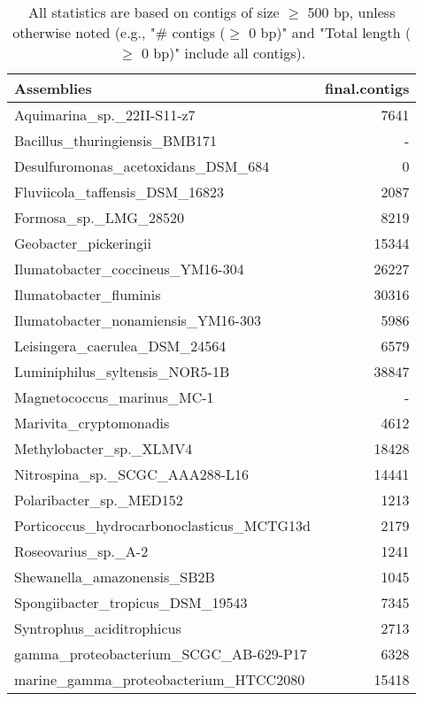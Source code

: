 \documentclass[12pt,a4paper]{article}
\begin{document}
\begin{table}[ht]
\begin{center}
\caption{All statistics are based on contigs of size $\geq$ 500 bp, unless otherwise noted (e.g., "\# contigs ($\geq$ 0 bp)" and "Total length ($\geq$ 0 bp)" include all contigs).}
\begin{tabular}{|l*{1}{|r}|}
\hline
Assemblies & final.contigs \\ \hline
Aquimarina\_sp.\_22II-S11-z7 & 7641 \\ \hline
Bacillus\_thuringiensis\_BMB171 & - \\ \hline
Desulfuromonas\_acetoxidans\_DSM\_684 & 0 \\ \hline
Fluviicola\_taffensis\_DSM\_16823 & 2087 \\ \hline
Formosa\_sp.\_LMG\_28520 & 8219 \\ \hline
Geobacter\_pickeringii & 15344 \\ \hline
Ilumatobacter\_coccineus\_YM16-304 & 26227 \\ \hline
Ilumatobacter\_fluminis & 30316 \\ \hline
Ilumatobacter\_nonamiensis\_YM16-303 & 5986 \\ \hline
Leisingera\_caerulea\_DSM\_24564 & 6579 \\ \hline
Luminiphilus\_syltensis\_NOR5-1B & 38847 \\ \hline
Magnetococcus\_marinus\_MC-1 & - \\ \hline
Marivita\_cryptomonadis & 4612 \\ \hline
Methylobacter\_sp.\_XLMV4 & 18428 \\ \hline
Nitrospina\_sp.\_SCGC\_AAA288-L16 & 14441 \\ \hline
Polaribacter\_sp.\_MED152 & 1213 \\ \hline
Porticoccus\_hydrocarbonoclasticus\_MCTG13d & 2179 \\ \hline
Roseovarius\_sp.\_A-2 & 1241 \\ \hline
Shewanella\_amazonensis\_SB2B & 1045 \\ \hline
Spongiibacter\_tropicus\_DSM\_19543 & 7345 \\ \hline
Syntrophus\_aciditrophicus & 2713 \\ \hline
gamma\_proteobacterium\_SCGC\_AB-629-P17 & 6328 \\ \hline
marine\_gamma\_proteobacterium\_HTCC2080 & 15418 \\ \hline
\end{tabular}
\end{center}
\end{table}
\end{document}
